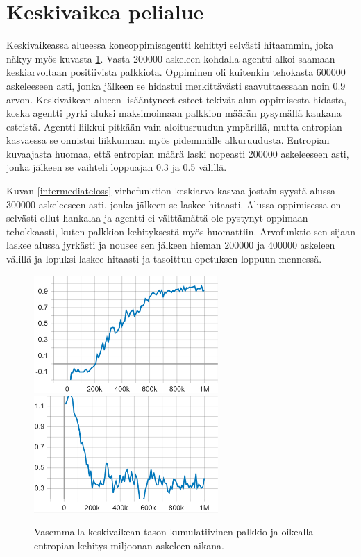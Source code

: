 \documentclass[utf8]{gradu3}
\begin{document}
\section{Keskivaikea pelialue}
\label{keskivaikea}

Keskivaikeassa alueessa koneoppimisagentti kehittyi selvästi hitaammin, joka näkyy myös kuvasta \ref{intermediatecumulativeentropy}. Vasta 200000 askeleen kohdalla agentti alkoi saamaan keskiarvoltaan positiivista palkkiota. Oppiminen oli kuitenkin tehokasta 600000 askeleeseen asti, jonka jälkeen se hidastui merkittävästi saavuttaessaan noin 0.9 arvon. Keskivaikean alueen lisääntyneet esteet tekivät alun oppimisesta hidasta, koska agentti pyrki aluksi maksimoimaan palkkion määrän pysymällä kaukana esteistä. Agentti liikkui pitkään vain aloitusruudun ympärillä, mutta entropian kasvaessa se onnistui liikkumaan myös pidemmälle alkuruudusta. Entropian kuvaajasta huomaa, että entropian määrä laski nopeasti 200000 askeleeseen asti, jonka jälkeen se vaihteli loppuajan 0.3 ja 0.5 välillä.

Kuvan \ref{intermediateloss} virhefunktion keskiarvo kasvaa jostain syystä alussa 300000 askeleeseen asti, jonka jälkeen se laskee hitaasti. Alussa oppimisessa on selvästi ollut hankalaa ja agentti ei välttämättä ole pystynyt oppimaan tehokkaasti, kuten palkkion kehityksestä myös huomattiin. Arvofunktio sen sijaan laskee alussa jyrkästi ja nousee sen jälkeen hieman 200000 ja 400000 askeleen välillä ja lopuksi laskee hitaasti ja tasoittuu opetuksen loppuun mennessä.

\begin{figure}[h]
\includegraphics[width=7cm]{I_Cumulative_Reward.png}
\includegraphics[width=7cm]{I_Policy_Entropy.png}
\caption{Vasemmalla keskivaikean tason kumulatiivinen palkkio ja oikealla entropian kehitys miljoonan askeleen aikana.}
\label{intermediatecumulativeentropy}
\end{figure}
\end{document}
